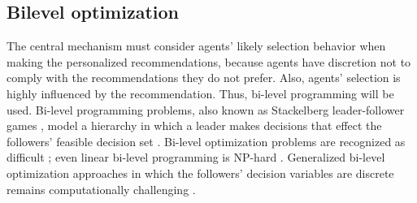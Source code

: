 \documentclass[11pt, letterpaper]{article}
\begin{document}
\subsection{Bilevel optimization}
The central mechanism must consider agents' likely selection behavior when making the personalized recommendations, because agents have discretion not to comply with the recommendations they do not prefer.  Also, agents' selection is highly influenced by the recommendation. Thus, bi-level programming will be used.      
Bi-level programming problems, also known as Stackelberg leader-follower games \cite{bracken1973mathematical, von1952theory}, model a hierarchy in which a leader makes decisions that effect the followers' feasible decision set \cite{bracken1973mathematical,  candler1977multi, colson2007overview}. Bi-level optimization problems are recognized as difficult \cite{dempe2016solution}; even linear bi-level programming is NP-hard \cite{audet1997links, bard1998practical, frangioni1995new}. Generalized bi-level optimization approaches in which the followers' decision variables  are discrete  remains computationally challenging \cite{moore1990mixed, xu2012three, zeng2014solving}.  
\end{document}
